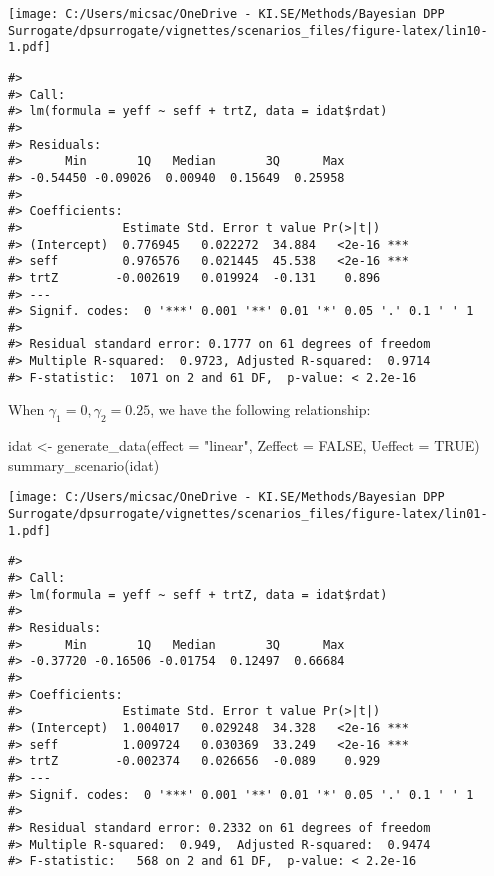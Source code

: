 \documentclass[
]{article}
\newenvironment{Shaded}{\begin{snugshade}}{\end{snugshade}}
\newcommand{\AttributeTok}[1]{\textcolor[rgb]{0.77,0.63,0.00}{#1}}
\newcommand{\ConstantTok}[1]{\textcolor[rgb]{0.00,0.00,0.00}{#1}}
\newcommand{\FunctionTok}[1]{\textcolor[rgb]{0.00,0.00,0.00}{#1}}
\newcommand{\NormalTok}[1]{#1}
\newcommand{\OtherTok}[1]{\textcolor[rgb]{0.56,0.35,0.01}{#1}}
\newcommand{\StringTok}[1]{\textcolor[rgb]{0.31,0.60,0.02}{#1}}
\begin{document}
\texttt{[image: C:/Users/micsac/OneDrive - KI.SE/Methods/Bayesian DPP Surrogate/dpsurrogate/vignettes/scenarios\_files/figure-latex/lin10-1.pdf]}

\begin{verbatim}
#> 
#> Call:
#> lm(formula = yeff ~ seff + trtZ, data = idat$rdat)
#> 
#> Residuals:
#>      Min       1Q   Median       3Q      Max 
#> -0.54450 -0.09026  0.00940  0.15649  0.25958 
#> 
#> Coefficients:
#>              Estimate Std. Error t value Pr(>|t|)    
#> (Intercept)  0.776945   0.022272  34.884   <2e-16 ***
#> seff         0.976576   0.021445  45.538   <2e-16 ***
#> trtZ        -0.002619   0.019924  -0.131    0.896    
#> ---
#> Signif. codes:  0 '***' 0.001 '**' 0.01 '*' 0.05 '.' 0.1 ' ' 1
#> 
#> Residual standard error: 0.1777 on 61 degrees of freedom
#> Multiple R-squared:  0.9723, Adjusted R-squared:  0.9714 
#> F-statistic:  1071 on 2 and 61 DF,  p-value: < 2.2e-16
\end{verbatim}

When \(\gamma_1 = 0, \gamma_2 = 0.25\), we have the following
relationship:

\begin{Shaded}
\begin{Highlighting}[]
\NormalTok{idat }\OtherTok{\textless{}{-}} \FunctionTok{generate\_data}\NormalTok{(}\AttributeTok{effect =} \StringTok{"linear"}\NormalTok{, }\AttributeTok{Zeffect =} \ConstantTok{FALSE}\NormalTok{, }\AttributeTok{Ueffect =} \ConstantTok{TRUE}\NormalTok{)}
\FunctionTok{summary\_scenario}\NormalTok{(idat)}
\end{Highlighting}
\end{Shaded}

\texttt{[image: C:/Users/micsac/OneDrive - KI.SE/Methods/Bayesian DPP Surrogate/dpsurrogate/vignettes/scenarios\_files/figure-latex/lin01-1.pdf]}

\begin{verbatim}
#> 
#> Call:
#> lm(formula = yeff ~ seff + trtZ, data = idat$rdat)
#> 
#> Residuals:
#>      Min       1Q   Median       3Q      Max 
#> -0.37720 -0.16506 -0.01754  0.12497  0.66684 
#> 
#> Coefficients:
#>              Estimate Std. Error t value Pr(>|t|)    
#> (Intercept)  1.004017   0.029248  34.328   <2e-16 ***
#> seff         1.009724   0.030369  33.249   <2e-16 ***
#> trtZ        -0.002374   0.026656  -0.089    0.929    
#> ---
#> Signif. codes:  0 '***' 0.001 '**' 0.01 '*' 0.05 '.' 0.1 ' ' 1
#> 
#> Residual standard error: 0.2332 on 61 degrees of freedom
#> Multiple R-squared:  0.949,  Adjusted R-squared:  0.9474 
#> F-statistic:   568 on 2 and 61 DF,  p-value: < 2.2e-16
\end{verbatim}
\end{document}
